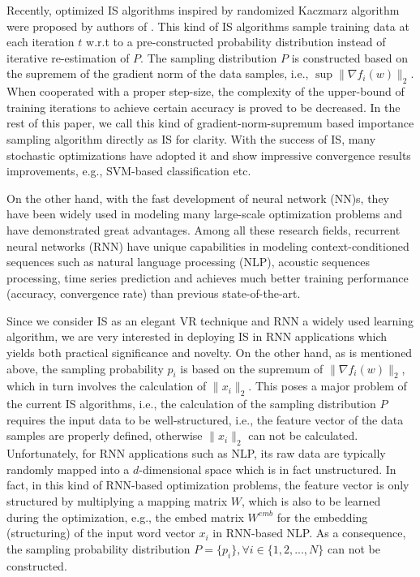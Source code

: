\documentclass[twoside,leqno,twocolumn]{article}
\begin{document}
Recently, optimized IS algorithms inspired by randomized Kaczmarz algorithm were proposed by authors of \cite{csiba2016importance, Needell, Strohmer, p_zhao}. This kind of IS algorithms sample training data at each iteration $t$ w.r.t to a pre-constructed probability distribution instead of iterative re-estimation of $P$. The sampling distribution $P$ is constructed based on the supremem of the gradient norm of the data samples, i.e., $\sup \|\nabla f_i(w)\|_2$. When cooperated with a proper step-size, the complexity of the upper-bound of training iterations to achieve certain accuracy is proved to be decreased. In the rest of this paper, we call this kind of gradient-norm-supremum based importance sampling algorithm directly as IS for clarity. With the success of IS, many stochastic optimizations have adopted it and show impressive convergence results improvements, e.g., SVM-based classification etc.

On the other hand, with the fast development of neural network (NN)s, they have been widely used in modeling many large-scale optimization problems and have demonstrated great advantages. Among all these research fields, recurrent neural networks (RNN) have unique capabilities in modeling context-conditioned sequences such as natural language processing (NLP), acoustic sequences processing, time series prediction and achieves much better training performance (accuracy, convergence rate) than previous state-of-the-art. 

Since we consider IS as an elegant VR technique and RNN a widely used learning algorithm, we are very interested in deploying IS in RNN applications which yields both practical significance and novelty. On the other hand, as is mentioned above, the sampling probability $p_i$ is based on the supremum of $\|\nabla f_i(w)\|_2$, which in turn involves the calculation of $\|x_i\|_2$. This poses a major problem of the current IS algorithms, i.e., the calculation of the sampling distribution $P$ requires the input data to be well-structured, i.e., the feature vector of the data samples are properly defined, otherwise $\|x_i\|_2$ can not be calculated. Unfortunately, for RNN applications such as NLP, its raw data are typically randomly mapped into a $d$-dimensional space which is in fact unstructured. In fact, in this kind of RNN-based optimization problems, the feature vector is only structured by multiplying a mapping matrix $W$, which is also to be learned during the optimization, e.g., the embed matrix $W^{emb}$ for the embedding (structuring) of the input word vector $x_i$ in RNN-based NLP. As a consequence, the sampling probability distribution $P=\{p_i\},\forall i\in\{1,2,...,N\}$ can not be constructed. 
\end{document}
